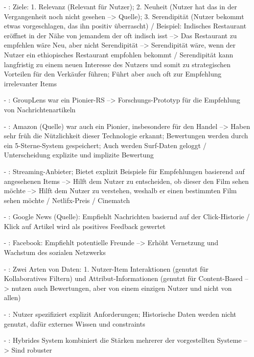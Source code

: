 - \cite[S. 4]{recommenderSystems:2016}: Ziele: 1. Relevanz (Relevant für Nutzer); 2. Neuheit (Nutzer hat das in der Vergangenheit noch nicht gesehen --> Quelle); 3. Serendipität (Nutzer bekommt etwas vorgeschlagen, das ihn positiv überrascht) / Beispiel: Indisches Restaurant eröffnet in der Nähe von jemandem der oft indisch isst --> Das Restaurant zu empfehlen wäre Neu, aber nicht Serendipität --> Serendipität wäre, wenn der Nutzer ein ethiopisches Restaurant empfohlen bekommt / Serendipität kann langfristig zu einem neuen Interesse des Nutzers und somit zu strategischen Vorteilen für den Verkäufer führen; Führt aber auch oft zur Empfehlung irrelevanter Items

- \cite[S. 5]{recommenderSystems:2016}: GroupLens war ein Pionier-RS --> Forschungs-Prototyp für die Empfehlung von Nachrichtenartikeln

- \cite[S. 5]{recommenderSystems:2016}: Amazon (Quelle) war auch ein Pionier, insbesondere für den Handel --> Haben sehr früh die Nützlichkeit dieser Technologie erkannt; Bewertungen werden durch ein 5-Sterne-System gespeichert; Auch werden Surf-Daten geloggt / Unterscheidung explizite und implizite Bewertung 

- \cite[S. 5f.]{recommenderSystems:2016}: Streaming-Anbieter; Bietet explizit Beispiele für Empfehlungen basierend auf angesehenen Items --> Hilft dem Nutzer zu entscheiden, ob dieser den Film sehen möchte --> Hilft dem Nutzer zu verstehen, weshalb er einen bestimmten Film sehen möchte / Netlifx-Preis / Cinematch

- \cite[S. 6]{recommenderSystems:2016}: Google News (Quelle): Empfiehlt Nachrichten basiernd auf der Click-Historie / Klick auf Artikel wird als positives Feedback gewertet 

- \cite[S. 7]{recommenderSystems:2016}: Facebook: Empfiehlt potentielle Freunde --> Erhöht Vernetzung und Wachstum des sozialen Netzwerks

- \cite[S. 8]{recommenderSystems:2016}: Zwei Arten von Daten: 1. Nutzer-Item Interaktionen (genutzt für Kollaboratives Filtern) und Attribut-Informationen (genutzt für Content-Based --> nutzen auch Bewertungen, aber von einem einzigen Nutzer und nicht von allen)

- \cite[S. 8]{recommenderSystems:2016}: Nutzer spezifiziert explizit Anforderungen; Historische Daten werden nicht genutzt, dafür externes Wissen und constraints 

- \cite[S. 8]{recommenderSystems:2016}: Hybrides System kombiniert die Stärken mehrerer der vorgestellten Systeme --> Sind robuster

